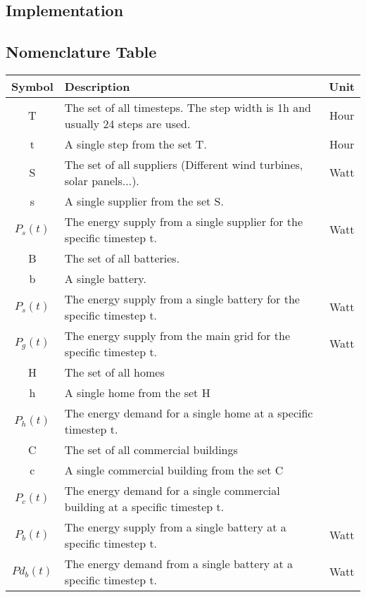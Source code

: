 \subsection{Implementation}


\subsection{Nomenclature Table}
	\begin{longtable}{|c|p{}|c|}
		\toprule
		\textbf{Symbol} & \textbf{Description} & \textbf{Unit} \\ \midrule
		T & The set of all timesteps. The step width is 1h and usually 24 steps are used. & Hour \\ \midrule
		t & A single step from the set T. & Hour \\ \midrule
		S & The set of all suppliers (Different wind turbines, solar panels...). & Watt \\ \midrule
		s & A single supplier from the set S. & \\ \midrule
		$P_{s}(t)$ & The energy supply from a single supplier for the specific timestep t. & Watt\\ \midrule
		B & The set of all batteries. & \\ \midrule
		b & A single battery. & \\ \midrule
		$P_{s}(t)$ & The energy supply from a single battery for the specific timestep t. & Watt \\ \midrule
		$P_{g}(t)$ & The energy supply from the main grid for the specific timestep t. & Watt \\ \midrule
		H & The set of all homes & \\ \midrule
		h & A single home from the set H & \\ \midrule
		$P_{h}(t)$ & The energy demand for a single home at a specific timestep t. & \\ \midrule
		C & The set of all commercial buildings & \\ \midrule
		c & A single commercial building from the set C & \\ \midrule
		$P_{c}(t)$ & The energy demand for a single commercial building at a specific timestep t. & \\ \midrule
		$P_{b}(t)$ & The energy supply from a single battery at a specific timestep t. & Watt \\ \midrule
		$Pd_{b}(t)$ & The energy demand from a single battery at a specific timestep t. & Watt \\ \midrule

\end{longtable}
